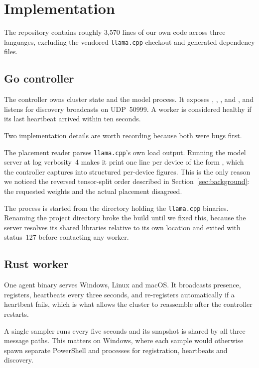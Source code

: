 \section{Implementation}

The repository contains roughly 3{,}570 lines of our own code across three
languages, excluding the vendored \texttt{llama.cpp} checkout and generated
dependency files.

\subsection{Go controller}

The controller owns cluster state and the model process. It exposes
, , ,
 and , and listens for discovery
broadcasts on UDP~50999. A worker is considered healthy if its last heartbeat
arrived within ten seconds.

Two implementation details are worth recording because both were bugs first.

The placement reader parses \texttt{llama.cpp}'s own load output. Running the
model server at log verbosity~4 makes it print one line per device of the form
, which the controller
captures into structured per-device figures. This is the only reason we noticed
the reversed tensor-split order described in Section~\ref{sec:background}: the
requested weights and the actual placement disagreed.

The process is started from the directory holding the \texttt{llama.cpp}
binaries. Renaming the project directory broke the build until we fixed this,
because the server resolves its shared libraries relative to its own location
and exited with status~127 before contacting any worker.

\subsection{Rust worker}

One agent binary serves Windows, Linux and macOS. It broadcasts presence,
registers, heartbeats every three seconds, and re-registers automatically if a
heartbeat fails, which is what allows the cluster to reassemble after the
controller restarts.

A single sampler runs every five seconds and its snapshot is shared by all three
message paths. This matters on Windows, where each sample would otherwise spawn
separate PowerShell and  processes for registration,
heartbeats and discovery.


